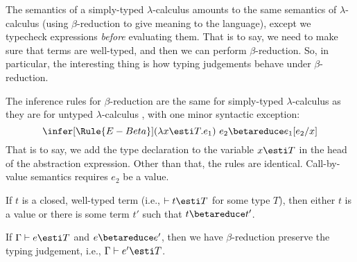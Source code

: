 \begin{node}[Semantics]\label{stlc-000I}%

\begin{node}\label{stlc-000J}%
The semantics of a simply-typed $\lambda$-calculus amounts to the same
semantics of $\lambda$-calculus (using $\beta$-reduction to give meaning
to the language), except we typecheck expressions \emph{before}
evaluating them. That is to say, we need to make sure that terms are
well-typed, and then we can perform $\beta$-reduction. So, in
particular, the interesting thing is how typing judgements behave under
$\beta$-reduction. 
\end{node}

\begin{node}\label{stlc-000L}%
The inference rules for $\beta$-reduction are the same for simply-typed
$\lambda$-calculus as they are for untyped $\lambda$-calculus ,
with one minor syntactic exception:
\begin{equation}
\infer[\Rule{E-Beta}]{(\lambda x\esti T.e_{1})~e_{2}\betareduce e_{1}[e_{2}/x]}{}
\end{equation}
That is to say, we add the type declaration to the variable $x\esti T$
in the head of the abstraction expression. Other than that, the rules
are identical. Call-by-value semantics requires $e_{2}$ be a value.
\end{node}

\begin{theorem}[Progress]
If $t$ is a closed, well-typed term (i.e., $\vdash t\esti T$ for some
type $T$), then either $t$ is a value or there is some term $t'$ such
that $t\betareduce t'$.
\end{theorem}

\begin{theorem}[Preservation]
If $\Gamma\vdash e\esti T$ and $e\betareduce e'$, then we have
$\beta$-reduction preserve the typing judgement, i.e., $\Gamma\vdash e'\esti T$.
\end{theorem}
  
\end{node}
